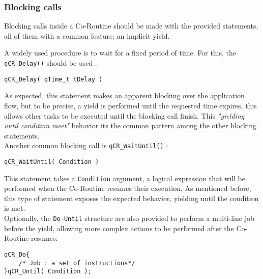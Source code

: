 \subsubsection{Blocking calls}
Blocking calls inside a Co-Routine should be made with the provided statements, all of them with a common feature: an implicit yield.

A widely used procedure is to wait for a fixed period of time. For this, the \lstinline{qCR_Delay()} should be used . 

\begin{lstlisting}[style=CStyle]
qCR_Delay( qTime_t tDelay ) 
\end{lstlisting}

As expected, this statement makes an apparent blocking over the application flow, but to be precise, a yield is performed until the requested time expires, this allows other tasks to be executed until the blocking call finish. This \textit{"yielding until condition meet"} behavior its the common pattern among the other blocking statements. \\

Another common blocking call is \lstinline{qCR_WaitUntil()} :

\begin{lstlisting}[style=CStyle]
qCR_WaitUntil( Condition ) 
\end{lstlisting}

This statement takes a \lstinline{Condition} argument, a logical expression that will be performed when the Co-Routine resumes their execution. As mentioned before, this type of statement exposes the expected behavior, yielding until the condition is met. \\


Optionally, the \lstinline{Do-Until}   structure are also provided to perform a multi-line job before the yield, allowing more complex actions to be performed after the Co-Routine  resumes: \\

\begin{lstlisting}[style=CStyle]
qCR_Do{
    /* Job : a set of instructions*/
}qCR_Until( Condition );
\end{lstlisting}

